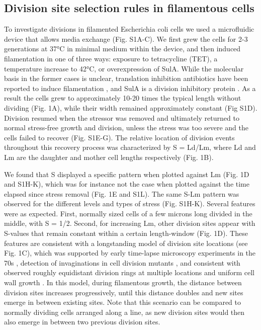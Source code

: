 \subsection{Division site selection rules in filamentous cells}
To investigate divisions in filamented Escherichia coli cells we used a microfluidic device that allows media exchange \cite{Boulineau2013} (Fig. S1A-C). We first grew the cells for 2-3 generations at 37°C in minimal medium within the device, and then induced filamentation in one of three ways: exposure to tetracycline (TET), a temperature increase to 42°C, or overexpression of SulA. While the molecular basis in the former cases is unclear, translation inhibition antibiotics have been reported to induce filamentation \cite{Pulvertaft1952}, and SulA is a division inhibitory protein \cite{Dajkovic2008}. As a result the cells grew to approximately 10-20 times the typical length without dividing (Fig. 1A), while their width remained approximately constant (Fig S1D). Division resumed when the stressor was removed and ultimately returned to normal stress-free growth and division, unless the stress was too severe and the cells failed to recover (Fig. S1E-G). The relative location of division events throughout this recovery process was characterized by S = Ld/Lm, where Ld and Lm are the daughter and mother cell lengths respectively (Fig. 1B). 

We found that S displayed a specific pattern when plotted against Lm (Fig. 1D and S1H-K), which was for instance not the case when plotted against the time elapsed since stress removal (Fig. 1E and S1L). The same S-Lm pattern was observed for the different levels and types of stress (Fig. S1H-K). Several features were as expected. First, normally sized cells of a few microns long divided in the middle, with S = 1/2. Second, for increasing Lm, other division sites appear with S-values that remain constant within a certain length-window (Fig. 1D). These features are consistent with a longstanding model of division site locations (see Fig. 1C), which was supported by early time-lapse microscopy experiments in the 70s \cite{Donachie1970}, detection of invaginations in cell division mutants \cite{Taschner1988}, and consistent with observed roughly equidistant division rings at multiple locations \cite{Addinall1997, Arjes2014, Mileykovskaya1998} and uniform cell wall growth \cite{Typas2012}. In this model, during filamentous growth, the distance between division sites increases progressively, until this distance doubles and new sites emerge in between existing sites. Note that this scenario can be compared to normally dividing cells arranged along a line, as new division sites would then also emerge in between two previous division sites.

